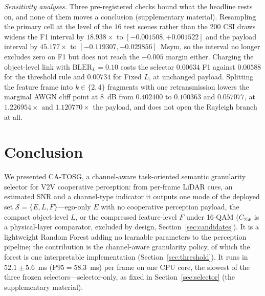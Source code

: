 \documentclass[journal]{IEEEtran}
\newcommand{\method}{CA-TOSG}
\begin{document}
\emph{Sensitivity analyses.} Three pre-registered checks bound what the headline rests on, and none
of them moves a conclusion (supplementary material). Resampling the primary cell at the level of
the $16$ test scenes rather than the $200$ CSI draws widens the F1 interval by $18.938\times$ to
$[-0.001508,+0.001522]$ and the payload interval by $45.177\times$ to $[-0.119307,-0.029856]$~Msym,
so the interval no longer excludes zero on F1 but does not reach the $-0.005$ margin either.
Charging the object-level link with $\mathrm{BLER}_L=0.10$ costs the selector $0.00634$ F1 against
$0.00588$ for the threshold rule and $0.00734$ for Fixed $L$, at unchanged payload. Splitting the
feature frame into $k\in\{2,4\}$ fragments with one retransmission lowers the marginal AWGN cliff
point at $8$~dB from $0.402400$ to $0.100363$ and $0.057077$, at $1.226954\times$ and
$1.120770\times$ the payload, and does not open the Rayleigh branch at all.

\section{Conclusion}

We presented \method{}, a channel-aware task-oriented semantic granularity selector for V2V cooperative perception: from per-frame LiDAR cues, an estimated SNR and a channel-type indicator it outputs one mode of the deployed set $\mathcal{S}=\{E,L,F\}$---ego-only $E$ with no cooperative perception payload, the compact object-level $L$, or the compressed feature-level $F$ under 16-QAM ($C_{256}$ is a physical-layer comparator, excluded by design, Section~\ref{sec:candidates}). It is a lightweight Random Forest adding no learnable parameters to the perception pipeline; the contribution is the channel-aware granularity policy, of which the forest is one interpretable implementation (Section~\ref{sec:threshold}). It runs in $52.1 \pm 5.6$~ms ($\mathrm{P95} = 58.3$~ms) per frame on one CPU core, the slowest of the three frozen selectors---selector-only, as fixed in Section~\ref{sec:selector} (the supplementary material).
\end{document}
